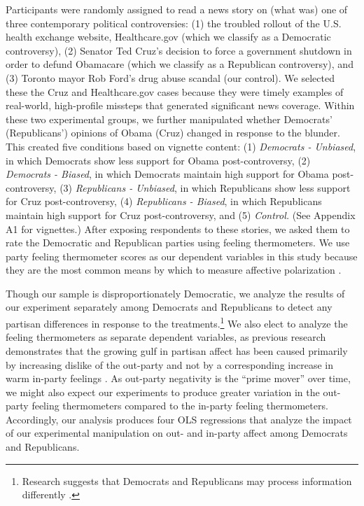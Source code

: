\documentclass[12pt, letterpaper]{article}
\begin{document}
Participants were randomly assigned to read a news story on (what was) one of three contemporary political controversies: (1) the troubled rollout of the U.S. health exchange website, Healthcare.gov (which we classify as a Democratic controversy), (2) Senator Ted Cruz's decision to force a government shutdown in order to defund Obamacare (which we classify as a Republican controversy), and (3) Toronto mayor Rob Ford's drug abuse scandal (our control). We selected these the Cruz and Healthcare.gov cases because they were timely examples of real-world, high-profile missteps that generated significant news coverage. Within these two experimental groups, we further manipulated whether Democrats' (Republicans') opinions of Obama (Cruz) changed in response to the blunder. This created five conditions based on vignette content:  (1) \textit{Democrats - Unbiased}, in which Democrats show less support for Obama post-controversy, (2) \textit{Democrats - Biased}, in which Democrats maintain high support for Obama post-controversy, (3) \textit{Republicans - Unbiased}, in which Republicans show less support for Cruz post-controversy, (4) \textit{Republicans - Biased}, in which Republicans maintain high support for Cruz post-controversy, and (5) \textit{Control.} (See Appendix A1 for vignettes.) After exposing respondents to these stories, we asked them to rate the Democratic and Republican parties using feeling thermometers. We use party feeling thermometer scores as our dependent variables in this study because they are the most common means by which to measure affective polarization \citep[e.g.,][]{haidthetherington_2012,hetheringtonrudolph_2015,IyengarSoodLelkes2012,IyengarWestwood2014,mason_2015}. 

Though our sample is disproportionately Democratic, we analyze the results of our experiment separately among Democrats and Republicans to detect any partisan differences in response to the treatments.\footnote{Research suggests that Democrats and Republicans may process information differently \citep{grossmanhopkins_2016}.} We also elect to analyze the feeling thermometers as separate dependent variables, as previous research demonstrates that the growing gulf in partisan affect has been caused primarily by increasing dislike of the out-party and not by a corresponding increase in warm in-party feelings \citep{haidthetherington_2012, IyengarSoodLelkes2012}. As out-party negativity is the ``prime mover'' over time, we might also expect our experiments to produce greater variation in the out-party feeling thermometers compared to the in-party feeling thermometers. Accordingly, our analysis produces four OLS regressions that analyze the impact of our experimental manipulation on out- and in-party affect among Democrats and Republicans. 
\end{document}
